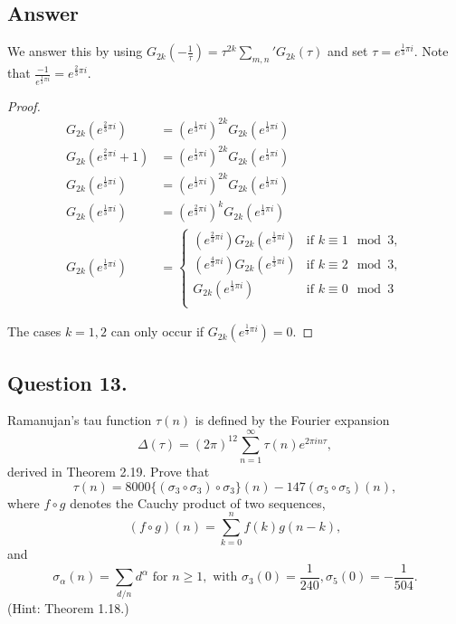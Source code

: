 \subsection*{Answer}
\noindent
We answer this by using
$
G_{2k}(-\frac{1}{\tau}) = \tau^{2k} \sum_{m,n}{'} G_{2k}(\tau)
$
and set $\tau = e^{\frac{1}{3}\pi i}$. Note that $\frac{-1}{e^{\frac{1}{3}\pi i}}=e^{\frac{2}{3}\pi i}$.

\begin{proof}
    \begin{align*}
        G_{2k}(e^{\frac{2}{3}\pi i}) &= (e^{\frac{1}{3}\pi i})^{2k} G_{2k}(e^{\frac{1}{3}\pi i}) \\
        G_{2k}(e^{\frac{2}{3}\pi i} + 1) &= (e^{\frac{1}{3}\pi i})^{2k} G_{2k}(e^{\frac{1}{3}\pi i}) \\
        G_{2k}(e^{\frac{1}{3}\pi i}) &= (e^{\frac{1}{3}\pi i})^{2k} G_{2k}(e^{\frac{1}{3}\pi i}) \\
        G_{2k}(e^{\frac{1}{3}\pi i}) &= (e^{\frac{2}{3}\pi i})^{k} G_{2k}(e^{\frac{1}{3}\pi i}) \\
        G_{2k}(e^{\frac{1}{3}\pi i}) &=
            \begin{cases}
                     (e^{\frac{2}{3}\pi i}) G_{2k}(e^{\frac{1}{3}\pi i}) & \text{if } k \equiv 1 \mod{3},\\
                     (e^{\frac{4}{3}\pi i}) G_{2k}(e^{\frac{1}{3}\pi i}) & \text{if } k \equiv 2 \mod{3},\\
                     G_{2k}(e^{\frac{1}{3}\pi i}) & \text{if } k \equiv 0 \mod{3}\\
            \end{cases}
    \end{align*}

The cases $k=1,2$ can only occur if $G_{2k}(e^{\frac{1}{3}\pi i}) = 0$.
\end{proof}


\subsection{Question 13.}
\noindent
Ramanujan's tau function $\tau(n)$ is defined by the Fourier expansion
\[
    \Delta(\tau)=(2\pi)^{12}\sum_{n=1}^{\infty}\tau(n)e^{2\pi i n \tau},
\]
derived in Theorem 2.19. Prove that
\[
    \tau(n)=8000 \{ (\sigma_3 \circ \sigma_3) \circ \sigma_3 \}(n) - 147 (\sigma_5 \circ \sigma_5)(n),
\]
where $f \circ g$ denotes the Cauchy product of two sequences,
\[
    (f \circ g)(n) = \sum_{k=0}^{n}f(k)g(n-k),
\]
and
\[
    \sigma_{\alpha}(n)= \sum_{d/n} d^{\alpha} \text{ for } n\geq 1, \text{ with } \sigma_3(0)=\frac{1}{240},
    \sigma_5(0)=-\frac{1}{504}.
\]
(Hint: Theorem 1.18.)

